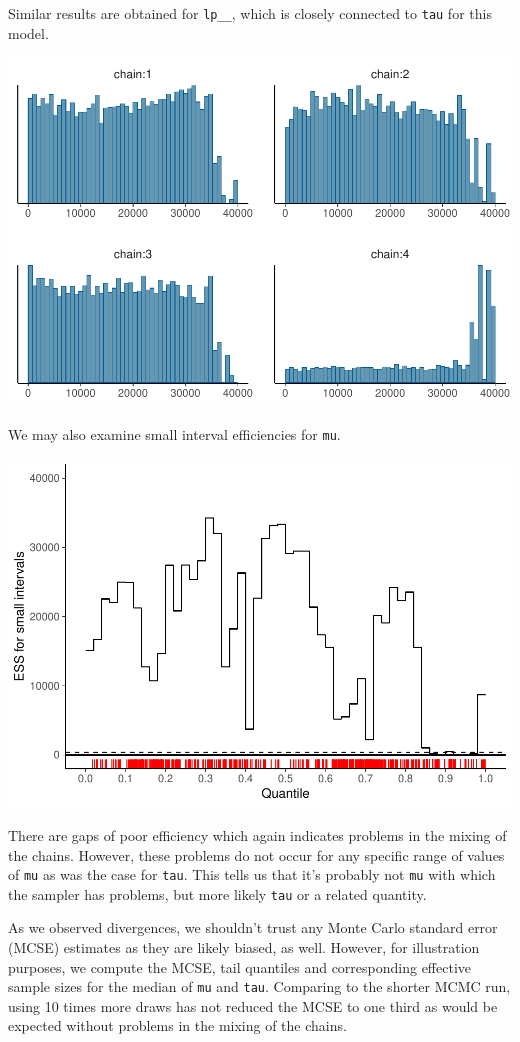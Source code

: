 \documentclass[american,]{article}
\begin{document}
Similar results are obtained for \texttt{lp\_\_}, which is closely
connected to \texttt{tau} for this model.

\includegraphics{graphics/hist-fit-cp2-lp-1.pdf}

We may also examine small interval efficiencies for \texttt{mu}.

\includegraphics{graphics/local-ess-fit-cp2-mu-1.pdf}

There are gaps of poor efficiency which again indicates problems in the
mixing of the chains. However, these problems do not occur for any
specific range of values of \texttt{mu} as was the case for
\texttt{tau}. This tells us that it's probably not \texttt{mu} with
which the sampler has problems, but more likely \texttt{tau} or a
related quantity.

As we observed divergences, we shouldn't trust any Monte Carlo standard
error (MCSE) estimates as they are likely biased, as well. However, for
illustration purposes, we compute the MCSE, tail quantiles and
corresponding effective sample sizes for the median of \texttt{mu} and
\texttt{tau}. Comparing to the shorter MCMC run, using 10 times more
draws has not reduced the MCSE to one third as would be expected without
problems in the mixing of the chains.
\end{document}
